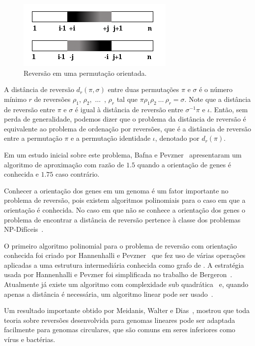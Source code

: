 \begin{figure}
  \centering
  \includegraphics{images/rev_orientada.png}
  \caption{Reversão em uma permutação orientada.}
  \label{fig:rev_orientada}
\end{figure}

A distância de reversão $d_{r}(\pi,\sigma)$ entre duas permutações
$\pi$ e $\sigma$ é o número mínimo $r$ de reversões $\rho_{1}$,
$\rho_{2}$,~$\ldots$~, $\rho_{r}$ tal que
$\pi \rho_{1} \rho_{2}~\ldots~\rho_{r} = \sigma$. Note que a distância
de reversão entre $\pi$ e $\sigma$ é igual à distância de reversão
entre $\sigma^{-1} \pi$ e $\iota$. Então, sem perda de generalidade,
podemos dizer que o problema da distância de reversão é equivalente ao
problema de ordenação por reversões, que é a distância de reversão
entre a permutação $\pi$ e a permutação identidade $\iota$, denotado
por $d_{r}(\pi)$.

Em um estudo inicial sobre este problema, Bafna e
Pevzner~\cite{BafnaPevzner*1996} apresentaram um algoritmo de
aproximação com razão de $1.5$ quando a orientação de genes é
conhecida e $1.75$ caso contrário.

Conhecer a orientação dos genes em um genoma é um fator importante no
problema de reversão, pois existem algoritmos polinomiais para o caso
em que a orientação é conhecida. No caso em que não se conhece a
orientação dos genes o problema de encontrar a distância de reversão
pertence à classe dos problemas NP-Difíceis~\cite{Caprara*1997}.

O primeiro algoritmo polinomial para o problema de reversão com
orientação conhecida foi criado por Hannenhalli e
Pevzner~\cite{HannenhalliPevzner*1995} que fez uso de várias operações
aplicadas a uma estrutura intermediária conhecida como grafo
de \bkp{}. A estratégia usada por Hannenhalli e Pevzner foi
simplificada no trabalho de Bergeron~\cite{Bergeron*2005}. Atualmente
já existe um algoritmo com complexidade
sub quadrática~\cite{TannierSagot*2004} e, quando apenas a distância é
necessária, um algoritmo linear pode ser
usado~\cite{BaderMoretYan*2001}.

Um resultado importante obtido por Meidanis, Walter e
Dias~\cite{MeidanisWalterDias*2000}, mostrou que toda teoria sobre
reversões desenvolvida para genomas lineares pode ser adaptada
facilmente para genomas circulares, que são comuns em seres inferiores
como vírus e bactérias.

